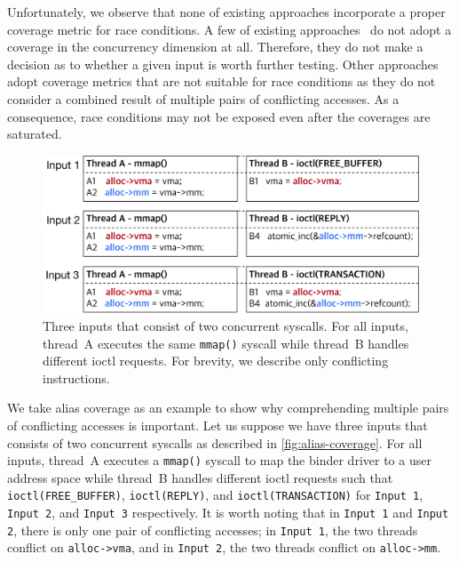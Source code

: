 Unfortunately, we observe that none of existing approaches incorporate
a proper coverage metric for race conditions.
%
A few of existing approaches~\cite{snowboard, razzer} do not adopt a
coverage in the concurrency dimension at all. Therefore, they do not
make a decision as to whether a given input is worth further testing.
%
Other approaches~\cite{krace, muzz} adopt coverage metrics that are
not suitable for race conditions as they do not consider a combined
result of multiple pairs of conflicting accesses. As a consequence,
race conditions may not be exposed even after the coverages are
saturated.
%


\begin{figure}[t]
  \centering
  \includegraphics[width=0.98\linewidth]{fig/alias-coverage.pdf}
  \caption{Three inputs that consist of two concurrent syscalls. For
    all inputs, thread~A executes the same \texttt{mmap()} syscall
    while thread~B handles different ioctl requests. For brevity, we
    describe only conflicting instructions.}
  \label{fig:alias-coverage}
\end{figure}

%
%
We take alias coverage as an example to show why comprehending
multiple pairs of conflicting accesses is important.
%
Let us suppose we have three inputs that consists of two concurrent
syscalls as described in \autoref{fig:alias-coverage}.
%
For all inputs, thread~A executes a \texttt{mmap()} syscall to map the
binder driver to a user address space while thread~B handles different
ioctl requests such that \texttt{ioctl(FREE_BUFFER)},
\texttt{ioctl(REPLY)}, and \texttt{ioctl(TRANSACTION)} for
\texttt{Input 1}, \texttt{Input 2}, and \texttt{Input 3} respectively.
%
It is worth noting that in \texttt{Input 1} and \texttt{Input 2},
there is only one pair of conflicting accesses; in \texttt{Input 1},
the two threads conflict on \texttt{alloc->vma}, and in \texttt{Input
  2}, the two threads conflict on \texttt{alloc->mm}.



